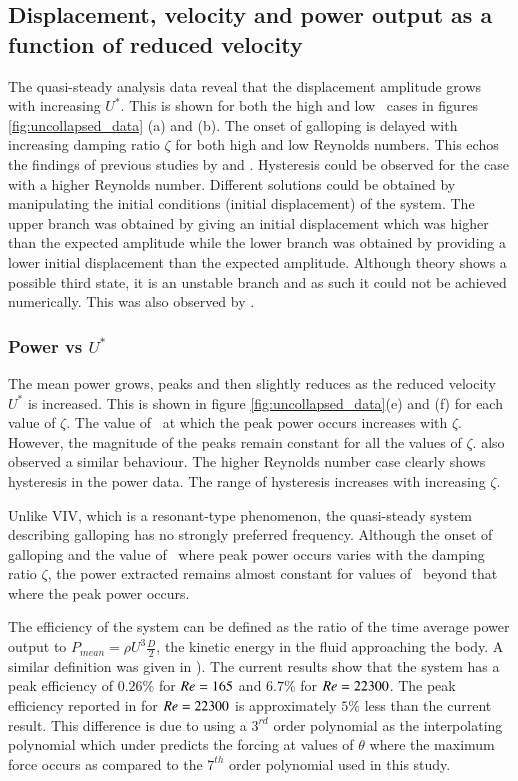 \subsection{Displacement, velocity and power output as a function of reduced velocity}

 The quasi-steady analysis data reveal that the displacement amplitude grows with increasing $U^*$. This is shown for both the high and low \reynoldsnumber\ cases in figures \ref{fig:uncollapsed_data} (a) and (b). The onset of galloping is delayed with increasing damping ratio $\zeta$ for both high and low Reynolds numbers. This echos the findings of previous studies by \cite{Parkinson1964} and \cite{Barrero-Gil2010a}. Hysteresis could be observed for the case with a higher Reynolds number. Different solutions could be obtained by manipulating the initial conditions (initial displacement) of the system. The upper branch was obtained by giving an initial displacement which was higher than the expected amplitude while the lower branch was obtained by providing a lower initial displacement than the expected amplitude. Although theory shows a possible third state, it is an unstable branch and as such it could not be achieved numerically. This was also observed by \cite{Vio2007}.

\subsubsection*{Power vs $U^*$}
 
 The mean power grows, peaks and then slightly reduces as the reduced velocity $U^*$ is increased. This is shown in figure \ref{fig:uncollapsed_data}(e) and (f) for each value of $\zeta$. The value of  \ustar\ at which the peak power occurs increases with $\zeta$. However, the magnitude of the peaks remain constant for all the values of $\zeta$. \citet{Barrero-Gil2010a} also observed a similar behaviour. The higher Reynolds number case clearly shows hysteresis in the power data. The range of hysteresis increases with increasing $\zeta$.

Unlike VIV, which is a resonant-type phenomenon, the quasi-steady system describing galloping has no strongly preferred frequency. Although the onset of galloping and the value of \ustar\ where peak power occurs varies with the damping ratio $\zeta$, the power extracted remains almost constant for values of \ustar\ beyond that where the peak power occurs. 

The efficiency of the system can be defined as the ratio of the time average power output to $P_{mean}=\rho U^3\frac{D}{2}$, the kinetic energy in the fluid approaching the body. A similar definition was given in \citet{Barrero-Gil2010a}). The current results show that the system has a peak efficiency of $0.26\%$  for $Re=165$ and $6.7\%$ for $Re=22300$. The peak efficiency reported in \citet{Barrero-Gil2010a} for $Re=22300$ is approximately $5\%$ less than the current result. This difference is due to \cite{Barrero-Gil2010a} using a $3^{rd}$ order polynomial as the interpolating polynomial which under predicts the forcing at values of $\theta$ where the maximum force occurs as compared to the $7^{th}$ order polynomial used in this study.   
 
